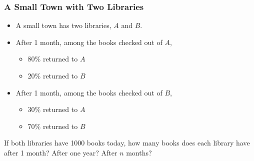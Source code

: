 \begin{frame}\frametitle{A Small Town with Two Libraries}

    \begin{itemize}
        \item A small town has two libraries, $A$ and $B$.
        \item After 1 month, among the books checked out of $A$,
        \begin{itemize}
            \item 80\% returned to $A$
            \item 20\% returned to $B$ 
        \end{itemize}
        \item After 1 month, among the books checked out of $B$,
        \begin{itemize}
            \item 30\% returned to $A$
            \item 70\% returned to $B$ 
        \end{itemize}       
    \end{itemize}
    \pause 
    If both libraries have 1000 books today, how many books does each library have after 1 month? After one year? After $n$ months? 

    \pause 
\vfill 
 
 \begin{center}
 \end{center}

    
 
\end{frame}


